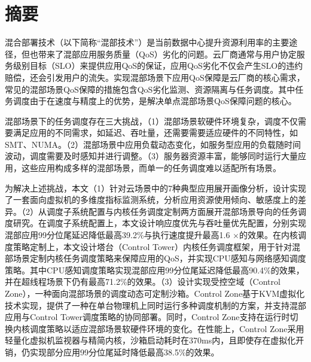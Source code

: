 
\maketitle%
\MAKETITLE%
\makedeclaration%
\intobmk\chapter*{摘\quad 要}%
\setcounter{page}{1}%


混合部署技术（以下简称“混部技术”）是当前数据中心提升资源利用率的主要途径，但也带来了混部应用服务质量（QoS）劣化的问题。云厂商通常与用户协定服务级别目标（SLO）来提供应用QoS的保证，应用QoS劣化不仅会产生SLO的违约赔偿，还会引发用户的流失。实现混部场景下应用QoS保障是云厂商的核心需求，常见的混部场景QoS保障的措施包含QoS劣化监测、资源隔离与任务调度。其中任务调度由于在速度与精度上的优势，是解决单点混部场景QoS保障问题的核心。

混部场景下的任务调度存在三大挑战，（1）混部场景软硬件环境复杂，调度不仅需要满足应用的不同需求，如延迟、吞吐量，还需要需要适应硬件的不同特性，如SMT、NUMA。（2）混部场景中应用负载动态变化，如服务型应用的负载随时间波动，调度需要及时感知并进行调整。（3）服务器资源丰富，能够同时运行大量应用，这些应用构成多样的混部场景，而单一的任务调度难以适配所有场景。

为解决上述挑战，本文（1）针对云场景中的7种典型应用展开画像分析，设计实现了一套面向虚拟机的多维度指标监测系统，分析应用资源使用倾向、敏感度上的差异。（2）从调度子系统配置与内核任务调度定制两方面展开混部场景导向的任务调度研究。在调度子系统配置上，本文设计响应度优先与吞吐量优先配置，分别实现混部应用99分位尾延迟降低最高39.2\%与执行速度提升最高1.6 $\times$的效果。在内核调度策略定制上，本文设计塔台（Control Tower）内核任务调度框架，用于针对混部场景定制内核任务调度策略来保障应用的QoS，并实现CPU感知与网络感知调度策略。其中CPU感知调度策略实现混部应用99分位尾延迟降低最高90.4\%的效果，并在超线程场景下仍有最高71.2\%的效果。（3）设计实现受控空域（Control Zone），一种面向混部场景的调度动态可定制沙箱。Control Zone基于KVM虚拟化技术实现，提供了一种在单台物理机上同时运行多种调度机制的方案，并支持混部应用与Control Tower调度策略的协同部署。同时，Control Zone支持在运行时切换内核调度策略以适应混部场景软硬件环境的变化。在性能上，Control Zone采用轻量化虚拟机监视器与精简内核，沙箱启动耗时在370ms内，且即使存在虚拟化开销，仍实现部分应用99分位尾延时降低最高38.5\%的效果。

